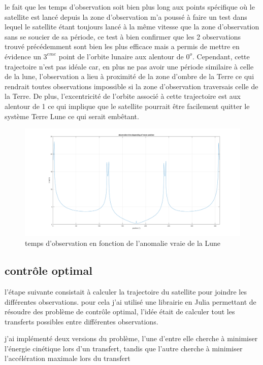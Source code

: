 \documentclass{article} %
\begin{document}
		le fait que les temps d'observation soit bien plus long aux points spécifique où le satellite est lancé depuis la zone d'observation m'a poussé à faire un test dans lequel le satellite étant toujours lancé à la même vitesse que la zone d'observation sans se soucier de sa période, ce test à bien confirmer que les 2 observations trouvé précédemment sont bien les plus efficace mais a permis de mettre en évidence un $3^{eme}$ point de l'orbite lunaire aux alentour de $0^o$. Cependant, cette trajectoire n'est pas idéale car, en plus ne pas avoir une période similaire à celle de la lune, l'observation a lieu à proximité de la zone d'ombre de la Terre ce qui rendrait toutes observations impossible si la zone d'observation traversais celle de la Terre. De plus, l'excentricité de l'orbite associé à cette trajectoire est aux alentour de 1 ce qui implique que le satellite pourrait être facilement quitter le système Terre Lune ce qui serait embêtant.
		\begin{figure}[h]
			\includegraphics[width=1\textwidth]{images/observation_Obs.png}
			\caption{temps d'observation en fonction de l'anomalie vraie de la Lune}
		\end{figure}
		
		\subsection{contrôle optimal}
		
		l'étape suivante consistait à calculer la trajectoire du satellite pour joindre les différentes observations.
		pour cela j'ai utilisé une librairie en Julia permettant de résoudre des problème de contrôle optimal, l'idée était de calculer tout les transferts possibles entre différentes observations.
		
		j'ai implémenté deux versions du problème, l'une d'entre elle cherche à minimiser l'énergie cinétique lors d'un transfert, tandis que l'autre cherche à minimiser l'accélération maximale lors du transfert
		
\end{document}
